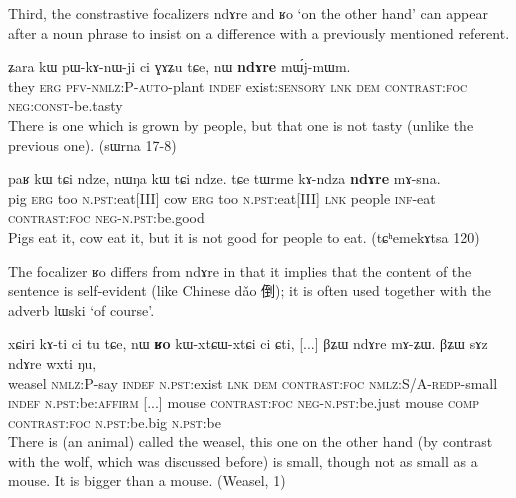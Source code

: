 \documentclass[oldfontcommands,oneside,a4paper,11pt]{article}
\newcommand{\ipa}[1]{{\phon \mbox{#1}}} %
\newcommand{\zh}[1]{{\cn #1}}
\begin{document}
Third, the constrastive focalizers \ipa{ndɤre}  and \ipa{ʁo}  `on the other hand' can appear after a noun phrase to insist on a difference with a previously mentioned referent.


\begin{exe}
\ex \label{ex:ndAre.mWjmWm}
\gll
\ipa{ʑara}  	\ipa{kɯ}  	\ipa{pɯ-kɤ-nɯ-ji}  	\ipa{ci}  	\ipa{ɣɤʑu}  	\ipa{tɕe,}  	\ipa{nɯ}  	\ipa{\textbf{ndɤre}}  	\ipa{mɯ́j-mɯm.}  \\
they \textsc{erg} \textsc{pfv-nmlz:P-auto}-plant \textsc{indef} exist:\textsc{sensory} \textsc{lnk} \textsc{dem} \textsc{contrast:foc} \textsc{neg:const}-be.tasty \\
\glt There is one which is grown by people, but that one is not tasty (unlike the previous one). (sɯrna 17-8)
\end{exe}

\begin{exe}
\ex \label{ex:ndAre.mAsna}
\gll
\ipa{paʁ}    	\ipa{kɯ}    	\ipa{tɕi}    	\ipa{ndze,}    	\ipa{nɯŋa}    	\ipa{kɯ}    	\ipa{tɕi}    	\ipa{ndze.}    	\ipa{tɕe}    	\ipa{tɯrme}    	\ipa{kɤ-ndza}    	\ipa{\textbf{ndɤre}}    	\ipa{mɤ-sna.}    \\
pig \textsc{erg} too \textsc{n.pst}:eat[III] cow  \textsc{erg} too \textsc{n.pst}:eat[III] \textsc{lnk} people \textsc{inf}-eat  \textsc{contrast:foc}  \textsc{neg-n.pst}:be.good \\
\glt Pigs eat it, cow eat it, but it is not good for people to eat. (tɕʰemekɤtsa 120)
\end{exe}

The focalizer \ipa{ʁo} differs from \ipa{ndɤre} in that it implies that the content of the sentence is self-evident (like Chinese \ipa{dǎo} \zh{倒}); it is often used together with the adverb \ipa{lɯski} `of course'.

\begin{exe}
\ex \label{ex:Ro.ndAre}
\gll
\ipa{xɕiri}    	\ipa{kɤ-ti}    	\ipa{ci}    	\ipa{tu}    	\ipa{tɕe,}    	\ipa{nɯ}    	\ipa{\textbf{ʁo}}    	\ipa{kɯ-xtɕɯ-xtɕi}    	\ipa{ci}    	\ipa{ɕti,}    	 [...] 	\ipa{βʑɯ}    	\ipa{ndɤre}    	\ipa{mɤ-ʑɯ.}    	\ipa{βʑɯ}    	\ipa{sɤz}    	\ipa{ndɤre}    	\ipa{wxti}    	\ipa{ŋu,}   \\
weasel \textsc{nmlz:P}-say \textsc{indef} \textsc{n.pst}:exist \textsc{lnk} \textsc{dem} \textsc{contrast:foc} \textsc{nmlz:S/A-redp}-small \textsc{indef} \textsc{n.pst}:be:\textsc{affirm} [...] mouse \textsc{contrast:foc} \textsc{neg-n.pst}:be.just mouse \textsc{comp} \textsc{contrast:foc} \textsc{n.pst}:be.big \textsc{n.pst}:be \\
\glt There is (an animal) called the weasel, this one on the other hand (by contrast with the wolf, which was discussed before) is small, though not as small as a mouse. It is bigger than a mouse. (Weasel, 1)
\end{exe}
\end{document}

